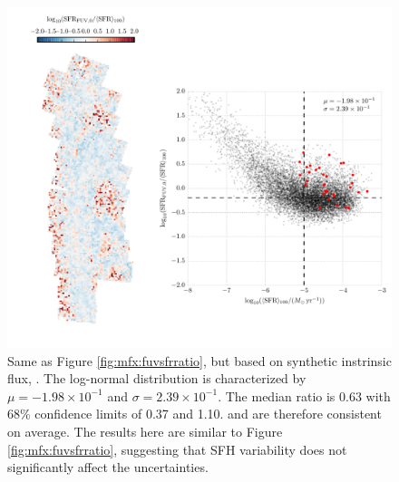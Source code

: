 \documentclass[iop, tighten]{emulateapj}
\begin{document}
\begin{figure}
\centering
\includegraphics[width=\textwidth]{m31flux-figures/sfr_fuv0-vs-mean.pdf}
\caption[Ratio of the \sfr{} based on the synthetic intrinsic \fuv{} flux to
the $100\myr$ mean \sfr{}.]{Same as Figure \ref{fig:mfx:fuvsfrratio}, but based
    on synthetic instrinsic flux, \sfrfuvz{}. The log-normal distribution is
    characterized by $\mu = -1.98\times 10^{-1}$ and $\sigma = 2.39\times
    10^{-1}$. The median ratio is 0.63 with 68\% confidence limits of 0.37 and
    1.10. \sfrfuvz{} and \sfroneh{} are therefore consistent on average. The
    results here are similar to Figure \ref{fig:mfx:fuvsfrratio}, suggesting
    that SFH variability does not significantly affect the \sfrfuv{}
    uncertainties.
}
\label{fig:mfx:fuvzsfrratio}
\end{figure}
\end{document}
